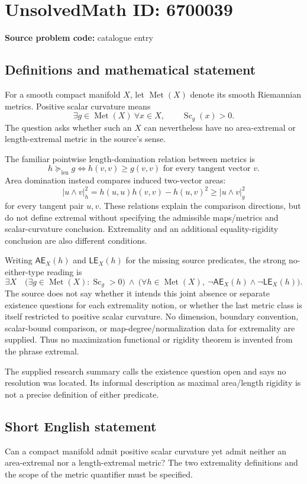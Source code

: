 \documentclass[11pt]{article}
\begin{document}
\section*{UnsolvedMath ID: 6700039}
\textbf{Source problem code:} catalogue entry
\subsection{Definitions and mathematical statement}
For a smooth compact manifold \(X\), let \(\operatorname{Met}(X)\) denote its smooth Riemannian metrics. Positive scalar curvature means
\[
\exists g\in\operatorname{Met}(X)\ \forall x\in X,
\qquad \operatorname{Sc}_g(x)>0.
\]
The question asks whether such an \(X\) can nevertheless have no area-extremal or length-extremal metric in the source's sense.

The familiar pointwise length-domination relation between metrics is
\[
h\succeq_{\mathrm{len}}g\iff h(v,v)\ge g(v,v)\text{ for every tangent vector }v.
\]
Area domination instead compares induced two-vector areas:
\[
|u\wedge v|_h^2=h(u,u)h(v,v)-h(u,v)^2
\ge |u\wedge v|_g^2
\]
for every tangent pair \(u,v\). These relations explain the comparison directions, but do not define extremal without specifying the admissible maps/metrics and scalar-curvature conclusion. Extremality and an additional equality-rigidity conclusion are also different conditions.

Writing \(\mathsf{AE}_X(h)\) and \(\mathsf{LE}_X(h)\) for the missing source predicates, the strong no-either-type reading is
\[
\exists X\quad
\bigl(\exists g\in\operatorname{Met}(X):\operatorname{Sc}_g>0\bigr)
\ \land\
\bigl(\forall h\in\operatorname{Met}(X),\
\neg\mathsf{AE}_X(h)\land\neg\mathsf{LE}_X(h)\bigr).
\]
The source does not say whether it intends this joint absence or separate existence questions for each extremality notion, or whether the last metric class is itself restricted to positive scalar curvature. No dimension, boundary convention, scalar-bound comparison, or map-degree/normalization data for extremality are supplied. Thus no maximization functional or rigidity theorem is invented from the phrase extremal.

The supplied research summary calls the existence question open and says no resolution was located. Its informal description as maximal area/length rigidity is not a precise definition of either predicate.
\subsection{Short English statement}
Can a compact manifold admit positive scalar curvature yet admit neither an area-extremal nor a length-extremal metric? The two extremality definitions and the scope of the metric quantifier must be specified.
\end{document}

